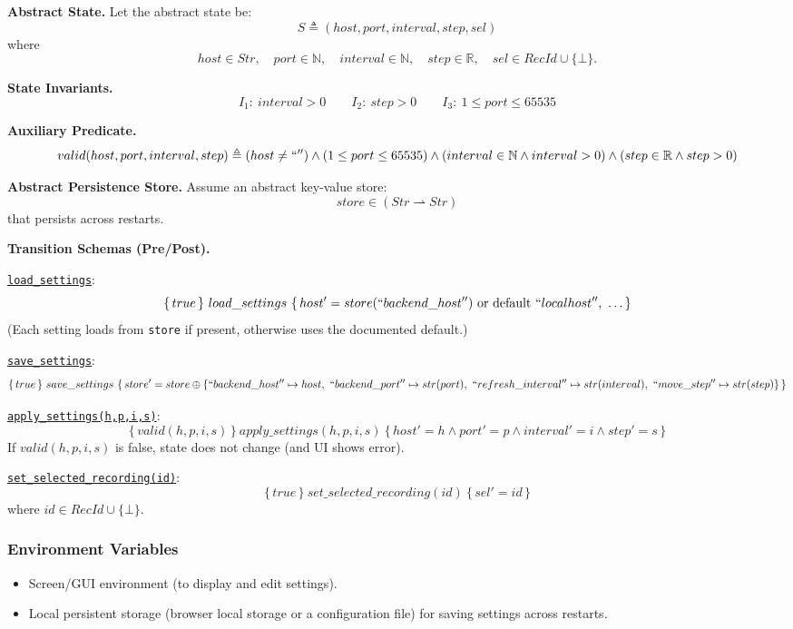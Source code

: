 \documentclass[12pt, titlepage]{article}
\begin{document}
\noindent\textbf{Abstract State.}
Let the abstract state be:
\[
  S \triangleq (host, port, interval, step, sel)
\]
where
\[
  host \in Str,\quad
  port \in \mathbb{N},\quad
  interval \in \mathbb{N},\quad
  step \in \mathbb{R},\quad
  sel \in \textit{RecId} \cup \{\bot\}.
\]

\noindent\textbf{State Invariants.}
\[
  I_1:\ interval > 0
  \qquad
  I_2:\ step > 0
  \qquad
  I_3:\ 1 \le port \le 65535
\]

\noindent\textbf{Auxiliary Predicate.}
\[
  valid(host,port,interval,step) \triangleq
  (host \neq ``'') \land (1 \le port \le 65535) \land (interval \in \mathbb{N} \land interval>0) \land (step \in \mathbb{R} \land step>0)
\]

\noindent\textbf{Abstract Persistence Store.}
Assume an abstract key-value store:
\[
  store \in (Str \rightharpoonup Str)
\]
that persists across restarts.

\noindent\textbf{Transition Schemas (Pre/Post).}

\noindent\underline{\texttt{load\_settings}}:
\[
  \{\, true \,\}\ load\_settings\ \{\,
  host' = store(``backend\_host'') \text{ or default } ``localhost'',\ \ldots \,\}
\]
(Each setting loads from \texttt{store} if present, otherwise uses the documented default.)

\noindent\underline{\texttt{save\_settings}}:
\[
  \{\, true \,\}\ save\_settings\ \{\, store' = store \oplus \{
  ``backend\_host''\mapsto host,\ ``backend\_port''\mapsto str(port),\ ``refresh\_interval''\mapsto str(interval),\ ``move\_step''\mapsto str(step) \}\,\}
\]

\noindent\underline{\texttt{apply\_settings(h,p,i,s)}}:
\[
  \{\, valid(h,p,i,s) \,\}\ apply\_settings(h,p,i,s)\ \{\, host'=h \land port'=p \land interval'=i \land step'=s \,\}
\]
If \(valid(h,p,i,s)\) is false, state does not change (and UI shows error).

\noindent\underline{\texttt{set\_selected\_recording(id)}}:
\[
  \{\, true \,\}\ set\_selected\_recording(id)\ \{\, sel' = id \,\}
\]
where \(id \in \textit{RecId} \cup \{\bot\}\).

\subsubsection{Environment Variables}

\begin{itemize}
  \item Screen/GUI environment (to display and edit settings).
  \item Local persistent storage (browser local storage or a configuration file) for
        saving settings across restarts.
\end{itemize}
\end{document}
